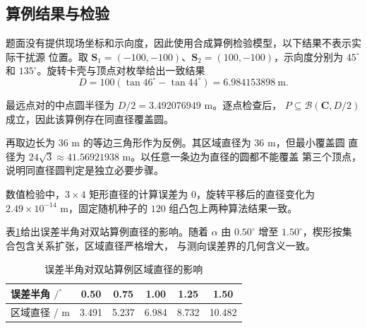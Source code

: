 \documentclass[withoutpreface,notoc]{cumcmthesis}
\newcommand{\bs}{\boldsymbol{S}}
\newcommand{\bC}{\boldsymbol{C}}
\newcommand{\Ball}{\mathcal{B}}
\begin{document}
\subsection{算例结果与检验}

题面没有提供现场坐标和示向度，因此使用合成算例检验模型，以下结果不表示实际干扰源
位置。取
$\bs_1=(-100,-100)$、$\bs_2=(100,-100)$，示向度分别为 $45^\circ$ 和
$135^\circ$。旋转卡壳与顶点对枚举给出一致结果
\begin{equation}
  D=100(\tan46^\circ-\tan44^\circ)
  =6.984153898\ \mathrm{m}.
  \label{eq:two-station-diameter}
\end{equation}

最远点对的中点圆半径为 $D/2=3.492076949$ m。逐点检查后，
$P\subseteq\Ball(\bC,D/2)$ 成立，因此该算例存在同直径覆盖圆。

再取边长为 $36$ m 的等边三角形作为反例。其区域直径为 $36$ m，但最小覆盖圆
直径为 $24\sqrt{3}\approx41.56921938$ m。以任意一条边为直径的圆都不能覆盖
第三个顶点，说明同直径圆判定是独立必要步骤。

数值检验中，$3\times4$ 矩形直径的计算误差为 $0$，旋转平移后的直径变化为
$2.49\times10^{-14}$ m，固定随机种子的 $120$ 组凸包上两种算法结果一致。

表\cref{tab:sensitivity}给出误差半角对双站算例直径的影响。随着 $\alpha$ 由
$0.50^\circ$ 增至 $1.50^\circ$，楔形按集合包含关系扩张，区域直径严格增大，
与测向误差界的几何含义一致。

\begin{table}[H]
  \centering
  \renewcommand{\arraystretch}{1.05}
  \caption{误差半角对双站算例区域直径的影响}
  \label{tab:sensitivity}
  \begin{tabular}{lccccc}
    \toprule
    误差半角 $/^\circ$ & 0.50 & 0.75 & 1.00 & 1.25 & 1.50\\
    \midrule
    区域直径 / m & 3.491 & 5.237 & 6.984 & 8.732 & 10.482\\
    \bottomrule
  \end{tabular}
\end{table}
\end{document}
